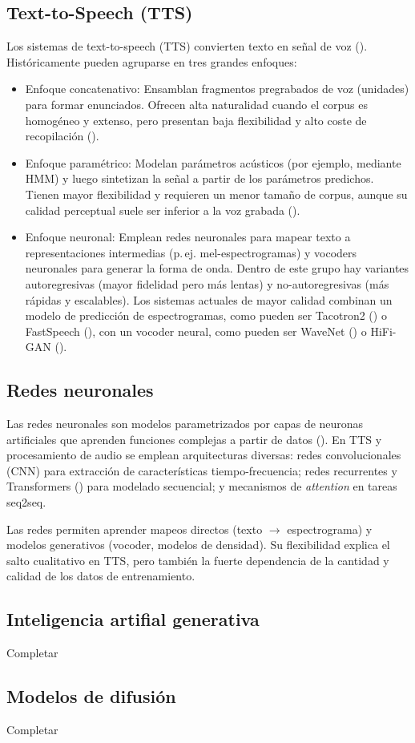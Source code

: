\subsection{Text-to-Speech (TTS)}
Los sistemas de text-to-speech (TTS) convierten texto en señal de voz (\cite{survey1}).
Históricamente pueden agruparse en tres grandes enfoques:

\begin{itemize}
    \item Enfoque concatenativo: Ensamblan fragmentos pregrabados de voz (unidades) para formar enunciados. Ofrecen alta naturalidad cuando el corpus es homogéneo y extenso, pero presentan baja flexibilidad y alto coste de recopilación (\cite{concatenative}).
    \item Enfoque paramétrico: Modelan parámetros acústicos (por ejemplo, mediante HMM) y luego sintetizan la señal a partir de los parámetros predichos. Tienen mayor flexibilidad y requieren un menor tamaño de corpus, aunque su calidad perceptual suele ser inferior a la voz grabada (\cite{parametrico}).
    \item Enfoque neuronal: Emplean redes neuronales para mapear texto a representaciones intermedias (p.\,ej. mel-espectrogramas) y vocoders neuronales para generar la forma de onda. Dentro de este grupo hay variantes autoregresivas (mayor fidelidad pero más lentas) y no-autoregresivas (más rápidas y escalables). Los sistemas actuales de mayor calidad combinan un modelo de predicción de espectrogramas, como pueden ser Tacotron2 (\cite{tacotron}) o FastSpeech (\cite{fastspeech}), con un vocoder neural, como pueden ser WaveNet (\cite{wavenet}) o HiFi-GAN (\cite{hifigan}). 
\end{itemize}

\subsection{Redes neuronales}
Las redes neuronales son modelos parametrizados por capas de neuronas artificiales que aprenden funciones complejas a partir de datos (\cite{goodfellow}).
En TTS y procesamiento de audio se emplean arquitecturas diversas: redes convolucionales (CNN) para extracción de características tiempo-frecuencia; redes recurrentes y Transformers (\cite{attention}) para modelado secuencial; y mecanismos de \emph{attention} en tareas seq2seq.

Las redes permiten aprender mapeos directos (texto $\rightarrow$ espectrograma) y modelos generativos (vocoder, modelos de densidad). Su flexibilidad explica el salto cualitativo en TTS, pero también la fuerte dependencia de la cantidad y calidad de los datos de entrenamiento.

\subsection{Inteligencia artifial generativa}
Completar

\subsection{Modelos de difusión}
Completar


